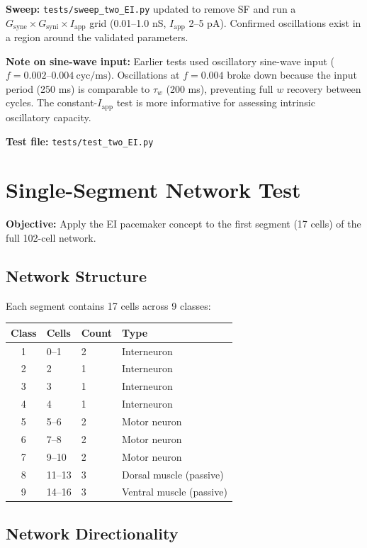 \documentclass[11pt]{article}
\begin{document}
\textbf{Sweep:} \texttt{tests/sweep\_two\_EI.py} updated to remove SF and run a $G_\text{syne} \times G_\text{syni} \times I_\text{app}$ grid (0.01--1.0 nS, $I_\text{app}$ 2--5 pA). Confirmed oscillations exist in a region around the validated parameters.

\textbf{Note on sine-wave input:} Earlier tests used oscillatory sine-wave input ($f = 0.002$--$0.004\ \text{cyc/ms}$). Oscillations at $f = 0.004$ broke down because the input period (250 ms) is comparable to $\tau_w$ (200 ms), preventing full $w$ recovery between cycles. The constant-$I_\text{app}$ test is more informative for assessing intrinsic oscillatory capacity.

\textbf{Test file:} \texttt{tests/test\_two\_EI.py}

\section{Single-Segment Network Test}

\textbf{Objective:} Apply the EI pacemaker concept to the first segment (17 cells) of the full 102-cell network.

\subsection{Network Structure}

Each segment contains 17 cells across 9 classes:

\begin{center}
\begin{tabular}{@{}clll@{}}
  \toprule
  Class & Cells  & Count & Type \\
  \midrule
  1 & 0--1   & 2 & Interneuron \\
  2 & 2      & 1 & Interneuron \\
  3 & 3      & 1 & Interneuron \\
  4 & 4      & 1 & Interneuron \\
  5 & 5--6   & 2 & Motor neuron \\
  6 & 7--8   & 2 & Motor neuron \\
  7 & 9--10  & 2 & Motor neuron \\
  8 & 11--13 & 3 & Dorsal muscle (passive) \\
  9 & 14--16 & 3 & Ventral muscle (passive) \\
  \bottomrule
\end{tabular}
\end{center}

\subsection{Network Directionality}
\end{document}

